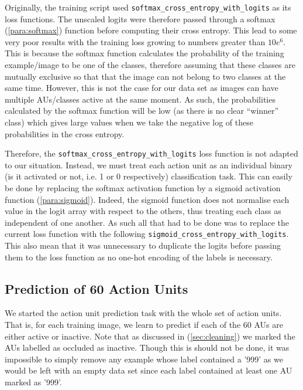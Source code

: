 \documentclass[12pt,twoside]{article}
\begin{document}
Originally, the training script used \texttt{softmax\_cross\_entropy\_with\_logits}
as its loss functions. The unscaled logits were therefore passed through a softmax (\ref{para:softmax}) 
function before computing their cross entropy. This lead to some very poor
results with the training loss growing to numbers greater than $10e^6$. This is
because the softmax function calculates the probability of the training
example/image to be one of the classes, therefore assuming that these classes
are mutually exclusive so that that the image can not belong to two classes at
the same time. However, this is not the case for our data set as images can
have multiple AUs/classes active at the same moment. As such, the probabilities
calculated by the softmax function will be low (as there is no clear
``winner'' class) which gives large values when we take the negative log of
these probabilities in the cross entropy. 

Therefore, the \texttt{softmax\_cross\_entropy\_with\_logits} loss function is
not adapted to our situation. Instead, we must treat each action unit as an
individual binary (is it activated or not, i.e. 1 or 0 respectively)
classification task. This can easily be done by replacing the softmax
activation function by a sigmoid activation function (\ref{para:sigmoid}). Indeed, the sigmoid
function does not normalise each value in the logit array with respect to the
others, thus treating each class as independent of one another. As such all
that had to be done was to replace the current loss function with the following
\texttt{sigmoid\_cross\_entropy\_with\_logits}. This also mean that it was
unnecessary to duplicate the logits before passing them to the loss function as no
one-hot encoding of the labels is necessary.

\subsection{Prediction of 60 Action Units}\label{sec:pred_60_au}

We started the action unit prediction task with the whole set of action
units. That is, for each training image,  we learn to predict if each of the 60
AUs are either active or inactive. Note that as discussed in
(\ref{sec:cleaning}) we marked the AUs labelled as occluded as inactive. Though
this is should not be done, it was impossible to simply remove any example
whose label contained a '999' as we would be left with an empty data set since
each label contained at least one AU marked as '999'.
\end{document}
